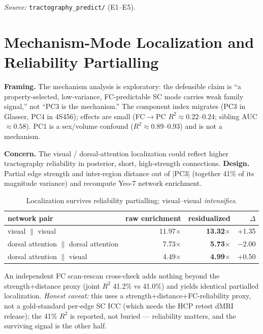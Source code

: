 \documentclass{article}
\begin{document}
\noindent\emph{Source:} \texttt{tractography\_predict/} (E1--E5).

\FloatBarrier
\section{Mechanism-Mode Localization and Reliability Partialling}

\textbf{Framing.} The mechanism analysis is exploratory: the defensible claim is ``a
property-selected, low-variance, FC-predictable SC mode carries weak family signal,'' not
``PC3 is the mechanism.'' The component index migrates (PC3 in Glasser, PC4 in 4S456); effects
are small (FC$\rightarrow$PC $R^2\approx 0.22$--$0.24$; sibling AUC $\approx 0.58$). PC1 is a
sex/volume confound ($R^2\approx 0.89$--$0.93$) and is not a mechanism.

\textbf{Concern.} The visual / dorsal-attention localization could reflect higher tractography
reliability in posterior, short, high-strength connections.
\textbf{Design.} Partial edge strength and inter-region distance out of $|\text{PC3}|$
(together 41\% of its magnitude variance) and recompute Yeo-7 network enrichment.

\begin{table}[h]
\centering\small
\caption{Localization survives reliability partialling; visual--visual \emph{intensifies}.}
\begin{tabular}{@{}lrrr@{}}
\toprule
\textbf{network pair} & \textbf{raw enrichment} & \textbf{residualized} & \textbf{$\Delta$} \\
\midrule
visual $\|$ visual & 11.97$\times$ & \textbf{13.32$\times$} & +1.35 \\
dorsal attention $\|$ dorsal attention & 7.73$\times$ & \textbf{5.73$\times$} & $-$2.00 \\
dorsal attention $\|$ visual & 4.49$\times$ & \textbf{4.99$\times$} & +0.50 \\
\bottomrule
\end{tabular}
\end{table}

An independent FC scan-rescan cross-check adds nothing beyond the strength+distance proxy
(joint $R^2$ 41.2\% vs 41.0\%) and yields identical partialled localization. \emph{Honest
caveat:} this uses a strength+distance+FC-reliability proxy, not a gold-standard per-edge SC
ICC (which needs the HCP retest dMRI release); the 41\% $R^2$ is reported, not buried ---
reliability matters, and the surviving signal is the other half.
\end{document}
